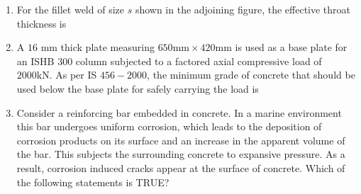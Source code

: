 \documentclass[journal]{IEEEtran}
\begin{document}
\begin{enumerate}
\begin{enumerate}
\end{enumerate}
\item For the fillet weld of size $s$ shown in the adjoining figure, the effective throat thickness is \\
\begin{enumerate}
\end{enumerate}
\item A $16$ mm thick plate measuring $650 \text{mm} \times 420 \text{mm} $ is used as a base plate for an ISHB $300$ column subjected to a factored axial compressive load of $2000  \text{kN}$. As per IS $456-2000$, the minimum grade of concrete that should be used below the base plate for safely carrying the load is
\begin{enumerate}
\end{enumerate}
\item Consider a reinforcing bar embedded in concrete. In a marine environment this bar undergoes uniform corrosion, which leads to the deposition of corrosion products on its surface and an increase in the apparent volume of the bar. This subjects the surrounding concrete to expansive pressure. As a result, corrosion induced cracks appear at the surface of concrete. Which of the following statements is TRUE?
\begin{enumerate}


\end{enumerate}
\end{enumerate}
\end{document}
